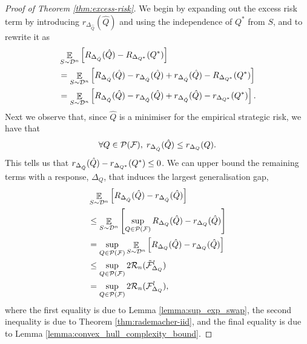 \begin{proof}[Proof of Theorem \ref{thm:excess-risk}]
    We begin by expanding out the excess risk term by introducing $r_{\Delta_{\hat{Q}}}(\hat{Q})$ and using the independence of $Q^{\ast}$ from $S$, and to rewrite it as
    \begin{equation}
        \begin{split}
            &\mathop{\mathbb{E}}_{S \sim \mathcal{D}^{n}} \left[ R_{\Delta_{\hat{Q}}}(\hat{Q}) - R_{\Delta_{Q^\ast}}(Q^\ast) \right] \\
            &= \mathop{\mathbb{E}}_{S \sim \mathcal{D}^{n}} \left[ R_{\Delta_{\hat{Q}}}(\hat{Q}) - r_{\Delta_{\hat{Q}}}(\hat{Q}) + r_{\Delta_{\hat{Q}}}(\hat{Q}) - R_{\Delta_{Q^\ast}}(Q^\ast) \right] \\
            &= \mathop{\mathbb{E}}_{S \sim \mathcal{D}^{n}} \left[ R_{\Delta_{\hat{Q}}}(\hat{Q}) - r_{\Delta_{\hat{Q}}}(\hat{Q}) + r_{\Delta_{\hat{Q}}}(\hat{Q}) - r_{\Delta_{Q^\ast}}(Q^\ast) \right].
        \end{split}
    \end{equation}
    Next we observe that, since $\hat{Q}$ is a minimiser for the empirical strategic risk, we have that
    \begin{equation}
        \forall Q \in {\mathcal{P}}({\mathcal{F}}), \;r_{\Delta_{\hat{Q}}}(\hat{Q}) \leq r_{\Delta_{Q}}(Q).
    \end{equation}
    This tells us that $r_{\Delta_{\hat{Q}}}(\hat{Q}) - r_{\Delta_{Q^\ast}}(Q^\ast) \leq 0$. We can upper bound the remaining terms with a response, $\Delta_{Q}$, that induces the largest generalisation gap,
    \begin{equation}
        \begin{split}
            &\mathop{\mathbb{E}}_{S \sim \mathcal{D}^{n}} \left[ R_{\Delta_{\hat{Q}}}(\hat{Q}) - r_{\Delta_{\hat{Q}}}(\hat{Q}) \right] \\
            &\leq \mathop{\mathbb{E}}_{S \sim \mathcal{D}^{n}} \left[ \sup_{Q \in {\mathcal{P}}({\mathcal{F}})} R_{\Delta_{Q}}(\hat{Q}) - r_{\Delta_{Q}}(\hat{Q}) \right] \\
            &= \sup_{Q \in {\mathcal{P}}({\mathcal{F}})} \mathop{\mathbb{E}}_{S \sim \mathcal{D}^{n}} \left[ R_{\Delta_{Q}}(\hat{Q}) - r_{\Delta_{Q}}(\hat{Q}) \right] \\
            &\leq \sup_{Q \in {\mathcal{P}}({\mathcal{F}})} 2{\mathcal{R}}_n(\tilde{{\mathcal{F}}}^l_{\Delta_Q}) \\
            &= \sup_{Q \in {\mathcal{P}}({\mathcal{F}})} 2{\mathcal{R}}_n({\mathcal{F}}^l_{\Delta_Q}),
        \end{split}
    \end{equation}
    where the first equality is due to Lemma \ref{lemma:sup_exp_swap}, the second inequality is due to Theorem \ref{thm:rademacher-iid}, and the final equality is due to Lemma \ref{lemma:convex_hull_complexity_bound}.
\end{proof}


